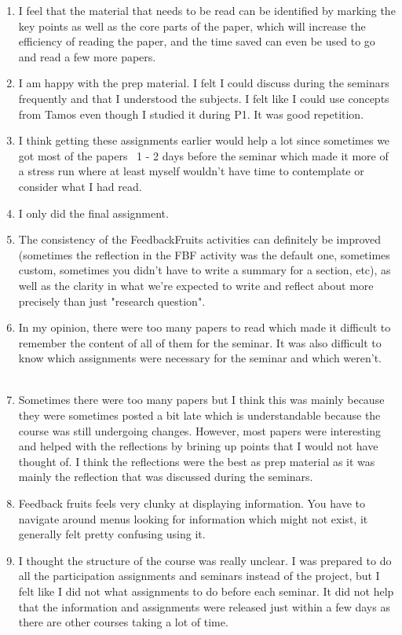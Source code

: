 \documentclass[a4paper]{report}
\begin{document}
\begin{enumerate}
  \item I feel that the material that needs to be read can be identified by marking the key points as well as the core parts of the paper, which will increase the efficiency of reading the paper, and the time saved can even be used to go and read a few more papers.
  \item I am happy with the prep material. I felt I could discuss during the seminars frequently and that I understood the subjects. I felt like I could use concepts from Tamos even though I studied it during P1. It was good repetition. 
  \item I think getting these assignments earlier would help a lot since sometimes we got most of the papers  1 - 2 days before the seminar which made it more of a stress run where at least myself wouldn't have time to contemplate or consider what I had read. 
  \item I only did the final assignment.
  \item The consistency of the FeedbackFruits activities can definitely be improved (sometimes the reflection in the FBF activity was the default one, sometimes custom, sometimes you didn't have to write a summary for a section, etc), as well as the clarity in what we're expected to write and reflect about more precisely than just "research question". 
  \item In my opinion, there were too many papers to read which made it difficult to remember the content of all of them for the seminar. It was also difficult to know which assignments were necessary for the seminar and which weren't.    
  \item Sometimes there were too many papers but I think this was mainly because they were sometimes posted a bit late which is understandable because the course was still undergoing changes. However, most papers were interesting and helped with the reflections by brining up points that I would not have thought of. I think the reflections were the best as prep material as it was mainly the reflection that was discussed during the seminars. 
  \item Feedback fruits feels very clunky at displaying information. You have to navigate around menus looking for information which might not exist, it generally felt pretty confusing using it. 
  \item I thought the structure of the course was really unclear. I was prepared to do all the participation assignments and seminars instead of the project, but I felt like I did not what assignments to do before each seminar. It did not help that the information and assignments were released just within a few days as there are other courses taking a lot of time.

\end{enumerate}
\end{document}
